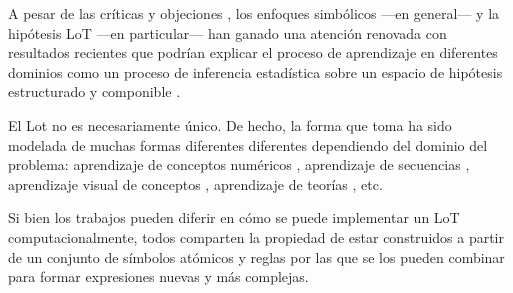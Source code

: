 
A pesar de las críticas y objeciones \cite{blackburn1984spreading,loewer1991meaning,knowles1998language,aydede1997language}, los enfoques simbólicos ---en general--- y la hipótesis LoT ---en particular--- han ganado una atención renovada con resultados recientes que podrían explicar el proceso de aprendizaje en diferentes dominios como un proceso de inferencia estadística sobre un espacio de hipótesis estructurado y componible \cite{tenenbaum2011grow,piantadosi2016four}.


El Lot no es necesariamente único. De hecho, la forma que toma ha sido modelada de muchas formas diferentes diferentes dependiendo del dominio del problema: aprendizaje de conceptos numéricos \cite{piantadosi2012bootstrapping}, aprendizaje de secuencias \cite{marie2016,yildirim2015learning,romano2013language}, aprendizaje visual de conceptos \cite{ellis2015unsupervised}, aprendizaje de teorías \cite{ullman2012theory}, etc.


Si bien los trabajos pueden diferir en cómo se puede implementar un LoT computacionalmente, todos comparten la propiedad de estar construidos a partir de un conjunto de símbolos atómicos y reglas por las que se los pueden combinar para formar expresiones nuevas y más complejas.


